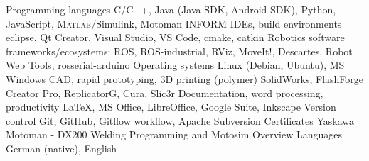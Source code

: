 
\begin{cvskills}
  \cvskill
    {Programming languages}
    {C/C++, Java (Java SDK, Android SDK), Python, JavaScript, \textsc{Matlab}/Simulink, \newline Motoman INFORM}
  \cvskill
    {IDEs, build environments}
    {eclipse, Qt Creator, Visual Studio, VS Code, cmake, catkin}
  \cvskill
    {Robotics software frameworks/ecosystems:}
    {ROS, ROS-industrial, RViz, MoveIt!, Descartes, Robot Web Tools, \newline rosserial-arduino}
  \cvskill
    {Operating systems}
    {Linux (Debian, Ubuntu), MS Windows}
  \cvskill
    {CAD, rapid prototyping, 3D printing (polymer)}
    {SolidWorks, FlashForge Creator Pro, ReplicatorG, Cura, Slic3r}
  \cvskill
    {Documentation, word processing, productivity}
    {\LaTeX, MS Office, LibreOffice, Google Suite, Inkscape}
  \cvskill
    {Version control}
    {Git, GitHub, Gitflow workflow, Apache Subversion}
  \cvskill
    {Certificates}
    {Yaskawa Motoman - DX200 Welding Programming and Motosim Overview}
  \cvskill
    {Languages}
    {German (native), English}

\end{cvskills}
